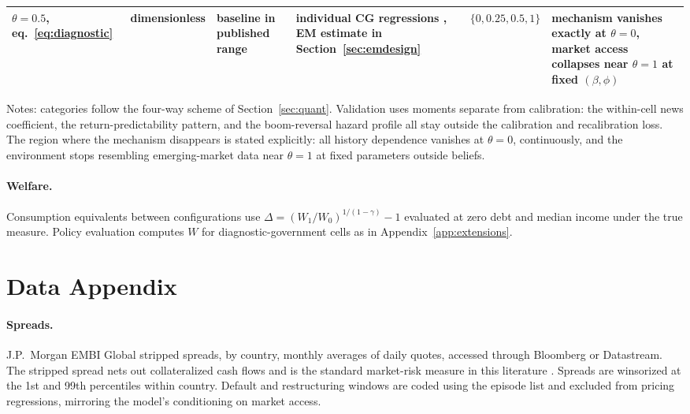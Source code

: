 \documentclass[11pt]{article}
\theoremstyle{definition}
\begin{document}
\begin{table}[t]
\begin{tabular}{p{1.8cm}p{1.8cm}p{2.0cm}p{2.8cm}p{1.9cm}p{3.0cm}}
$\theta = 0.5$, eq.~\eqref{eq:diagnostic} & dimensionless & baseline in published range & individual CG regressions \citep{BordaloGennaioliMaShleifer2020}, EM estimate in Section~\ref{sec:emdesign} & $\{0, 0.25, 0.5, 1\}$ & mechanism vanishes exactly at $\theta = 0$, market access collapses near $\theta = 1$ at fixed $(\beta,\phi)$ \\
\bottomrule
\end{tabular}
\par\smallskip
\begin{minipage}{0.97\textwidth}
\footnotesize Notes: categories follow the four-way scheme of Section~\ref{sec:quant}. Validation uses moments separate from calibration: the within-cell news coefficient, the return-predictability pattern, and the boom-reversal hazard profile all stay outside the calibration and recalibration loss. The region where the mechanism disappears is stated explicitly: all history dependence vanishes at $\theta = 0$, continuously, and the environment stops resembling emerging-market data near $\theta = 1$ at fixed parameters outside beliefs.
\end{minipage}
\end{table}

\paragraph{Welfare.} Consumption equivalents between configurations use $\Delta = (W_1 / W_0)^{1/(1-\gamma)} - 1$ evaluated at zero debt and median income under the true measure. Policy evaluation computes $W$ for diagnostic-government cells as in Appendix~\ref{app:extensions}.

\section{Data Appendix}\label{app:data}

\paragraph{Spreads.} J.P.~Morgan EMBI Global stripped spreads, by country, monthly averages of daily quotes, accessed through Bloomberg or Datastream. The stripped spread nets out collateralized cash flows and is the standard market-risk measure in this literature \citep{UribeYue2006, LongstaffEtAl2011}. Spreads are winsorized at the 1st and 99th percentiles within country. Default and restructuring windows are coded using the \citet{CrucesTrebesch2013} episode list and excluded from pricing regressions, mirroring the model's conditioning on market access.
\end{document}
